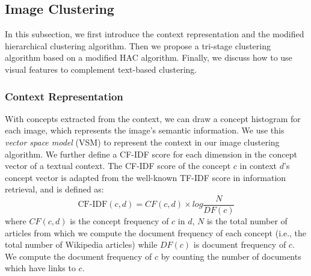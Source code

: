 




\subsection{Image Clustering}
In this subsection, we first introduce the context representation and the modified
hierarchical clustering algorithm. Then we propose a tri-stage clustering algorithm
based on a modified HAC algorithm. Finally, we discuss how to use visual features
to complement text-based clustering.

\subsubsection{Context Representation}
With concepts extracted from the context, we can draw a
concept histogram for each image, which represents the image's semantic
information. We use this \emph{vector space model} (VSM) to represent the
context in our image clustering algorithm. We further define a CF-IDF score
for each dimension in the concept vector of a textual context. The
CF-IDF score of the concept $c$ in context $d$'s concept vector
is adapted from the well-known TF-IDF score in information retrieval,
and is defined as:
\begin{equation}
\label{cfidf}
\mbox{CF-IDF}(c, d)= CF(c, d) \times log\frac{N}{DF(c)}
\end{equation}
where $CF(c,d)$ is the concept frequency of $c$ in $d$, $N$ is the
total number of articles from which we compute the document frequency
of each concept (i.e., the total number of Wikipedia articles)
while $DF(c)$ is document frequency of $c$. We compute the document
frequency of $c$ by counting the number of documents which have links
to $c$.

